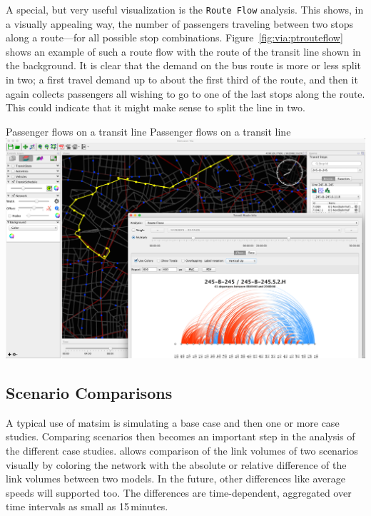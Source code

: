 A special, but very useful visualization is the \lstinline|Route Flow| analysis. This
shows, in a visually appealing way, the number of passengers traveling between
two stops along a route---for all possible stop combinations.
Figure~\ref{fig:via:ptrouteflow} shows an example of such a route flow with the
route of the transit line shown in the background.
It is clear that the demand on the bus route is more or less split in two; a
first travel demand up to about the first third of the route, and then it again
collects passengers all wishing to go to one of the last stops along the
route. This could indicate that it might make sense to split the line in two.

\createfigure%
{Passenger flows on a transit line}%
{Passenger flows on a transit line}%
{\label{fig:via:ptrouteflow}}%
{\includegraphics[width=1.\textwidth,angle=0]{./extending/figures/via/ptrouteflows}}%
{}

\subsection{Scenario Comparisons}
A typical use of \gls{matsim} is simulating a base case and then one or more
case studies. Comparing scenarios then becomes an important step in the analysis
of the different case studies. \Via{} allows comparison of the link volumes of two
scenarios visually by coloring the network with the absolute or relative
difference of the link volumes between two models. In the future, other
differences like average speeds will supported too. The differences are
time-dependent, aggregated over time intervals as small as 15\,minutes.

